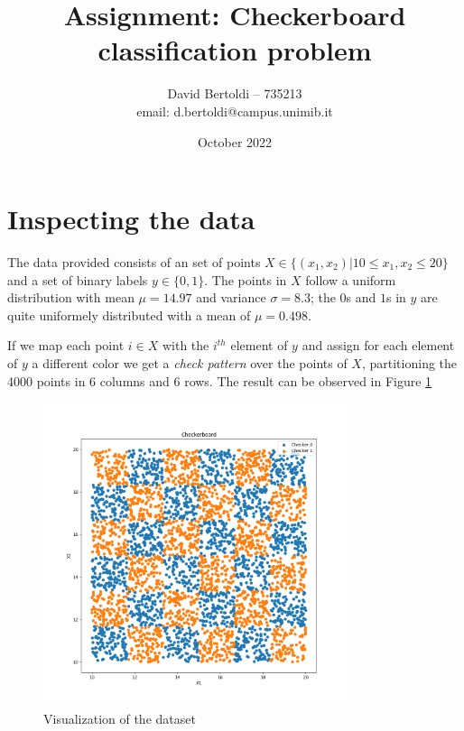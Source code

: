 \documentclass[compsoc]{IEEEtran}
\title{Assignment: Checkerboard classification problem}
\author{David Bertoldi -- 735213 \\ email: d.bertoldi@campus.unimib.it}
\affil{Department of Informatics, Systems and Communication}
\affil{University of Milano-Bicocca}
\date{October 2022}
\begin{document}
\maketitle 



\section{Inspecting the data}
The data provided consists of an set of points $X \in \{(x_1, x_2) | 10 \leq x_1, x_2 \leq 20\}$ and a set of binary labels $y \in \{0, 1\}$.
The points in $X$ follow a uniform distribution with mean $\mu = 14.97$ and variance $\sigma = 8.3$; the $0$s and $1$s in $y$ are quite uniformely distributed with 
a mean of $\mu = 0.498$. \par
If we map each point $i \in X$ with the $i^{th}$ element of $y$ and assign for each element of $y$ a different color we get a \emph{check pattern} over the points of $X$, partitioning the 4000 points in 6 columns and 6 rows.
The result can be observed in Figure \ref{fig:checkerboard}

\begin{figure}[ht!]
\centering                                                                        
\includegraphics[width=3.5in]{../images/checkerboard.png}
\captionsetup{justification=centering}                                                                                                                                   
\caption{Visualization of the dataset}
\label{fig:checkerboard}                                                                                                                                                           
\end{figure}
\end{document}
